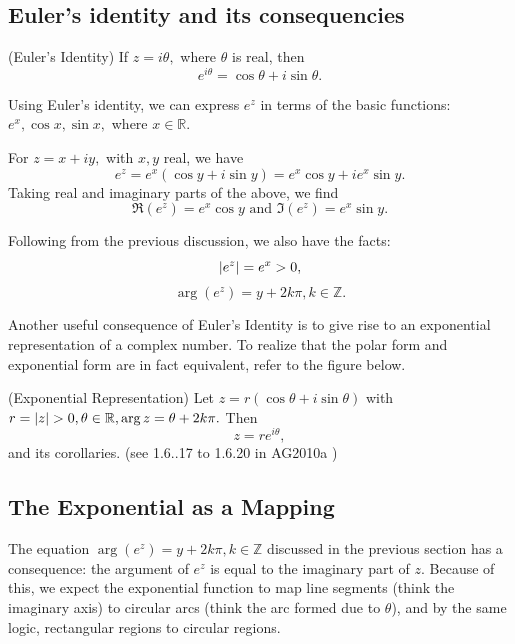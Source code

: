 \documentclass[11pt,reqno,oneside,a4paper]{article}
\begin{document}
\subsection{Euler's identity and its consequencies}
\begin{prop}
	(Euler's Identity)
	If $z = i\theta,$ where $\theta$ is real, then $$e^{i\theta} = \cos\theta + i\sin\theta.$$
\end{prop}

Using Euler's identity, we can express $e^z$ in terms of the basic functions: $e^x, \cos x, \sin x,$ where $x\in \mathbb{R}$.

\begin{cor}
	For $z=x+iy,$ with $x,y$ real, we have $$e^z = e^x(\cos y + i\sin y) = e^x \cos y + i e^x\sin y.$$
	Taking real and imaginary parts of the above, we find 
	$$\Re(e^z) = e^x \cos y \text{ and } \Im(e^z) = e^x \sin y.$$
\end{cor}

Following from the previous discussion, we also have the facts:
$$\left\lvert e^z\right\rvert = e^x >0,$$
$$\arg(e^z) = y + 2k\pi, k \in \mathbb{Z}.$$

Another useful consequence of Euler's Identity is to give rise to an exponential representation of a complex number. To realize that the polar form and exponential form are in fact equivalent, refer to the figure below. 

\begin{prop}
	(Exponential Representation)
	Let $z = r (\cos\theta + i\sin\theta)$ with $r=\left\lvert z\right\rvert >0, \theta \in \mathbb{R}, \arg z = \theta + 2k\pi.$ Then 
	$$z = re^{i\theta},$$
	and its corollaries. (see 1.6..17 to 1.6.20 in AG2010a \cite{AG2010a})
\end{prop}

\subsection{The Exponential as a Mapping}

The equation $\arg(e^z) = y + 2k\pi, k \in \mathbb{Z}$ discussed in the previous section has a consequence: the argument of $e^z$ is equal to the imaginary part of $z$. Because of this, we expect the exponential function to map line segments (think the imaginary axis) to circular arcs (think the arc formed due to $\theta$), and by the same logic, rectangular regions to circular regions. 
\end{document}
